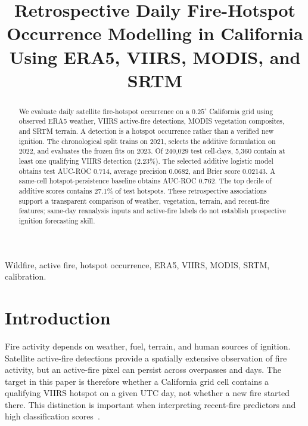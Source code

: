 \documentclass[conference]{IEEEtran}
\begin{document}
\title{Retrospective Daily Fire-Hotspot Occurrence Modelling in California\\Using ERA5, VIIRS, MODIS, and SRTM}
\author{
\and{}}
\maketitle
\begin{abstract}
We evaluate daily satellite fire-hotspot occurrence on a $0.25^\circ$ California grid using observed ERA5 weather, VIIRS active-fire detections, MODIS vegetation composites, and SRTM terrain. A detection is a hotspot occurrence rather than a verified new ignition. The chronological split trains on 2021, selects the additive formulation on 2022, and evaluates the frozen fits on 2023. Of 240,029 test cell-days, 5,360 contain at least one qualifying VIIRS detection (2.23\%). The selected additive logistic model obtains test AUC-ROC 0.714, average precision 0.0682, and Brier score 0.02143. A same-cell hotspot-persistence baseline obtains AUC-ROC 0.762. The top decile of additive scores contains 27.1\% of test hotspots. These retrospective associations support a transparent comparison of weather, vegetation, terrain, and recent-fire features; same-day reanalysis inputs and active-fire labels do not establish prospective ignition forecasting skill.
\end{abstract}
\begin{IEEEkeywords}
Wildfire, active fire, hotspot occurrence, ERA5, VIIRS, MODIS, SRTM, calibration.
\end{IEEEkeywords}

\section{Introduction}
Fire activity depends on weather, fuel, terrain, and human sources of ignition. Satellite active-fire detections provide a spatially extensive observation of fire activity, but an active-fire pixel can persist across overpasses and days. The target in this paper is therefore whether a California grid cell contains a qualifying VIIRS hotspot on a given UTC day, not whether a new fire started there. This distinction is important when interpreting recent-fire predictors and high classification scores~\cite{schroeder}.
\end{document}
